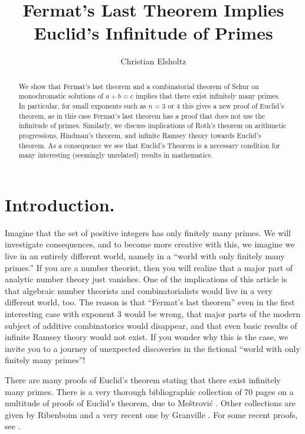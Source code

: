 \documentclass{article}
\theoremstyle{theorem}
\theoremstyle{definition}
\begin{document}
\title{
Fermat's Last Theorem Implies\\ Euclid's Infinitude of Primes}
\author{Christian Elsholtz
}
\maketitle



\begin{abstract}
We show that Fermat's last theorem and a combinatorial theorem of Schur on 
monochromatic solutions of $a+b=c$ implies that there exist infinitely 
many primes. In particular, for small exponents such as $n=3$ or $4$ 
this gives a new proof of Euclid's theorem, 
as in this case Fermat's last theorem has a proof that does not use 
the infinitude of primes. Similarly, we discuss implications of
Roth's theorem on arithmetic progressions, Hindman's theorem, and infinite
Ramsey theory towards Euclid's theorem.
As a consequence we see that Euclid's Theorem is a necessary condition for many
interesting (seemingly unrelated) results in mathematics.
\end{abstract}


\section{Introduction.}
Imagine that the set of positive integers has only finitely many primes.
We will investigate consequences, and to become more creative with this, we imagine 
we live in an entirely different world, namely in a ``world with only finitely many primes.''
If you are a number theorist, then you will realize that a major part of analytic number theory
just vanishes. One of the implications of this article is that algebraic
number theorists and combinatorialists would live in a very different 
world, too.
The reason is that ``Fermat's last theorem'' even in the first interesting case 
with exponent $3$ would be wrong, that major parts of the modern subject of
additive combinatorics would disappear,
and that even basic results of infinite Ramsey theory would not exist. 
If you wonder why
this is the case, we invite you to a journey
of unexpected discoveries in the 
fictional ``world with only finitely many primes''!



 There are many proofs of Euclid's theorem stating that there exist
infinitely many primes. 
There is a very thorough bibliographic collection of 70 pages on a multitude of proofs of Euclid's theorem,
due to Me\v{s}trovi\'{c} \cite{Mestrovic}. 
Other collections are given by Ribenboim \cite{Ribenboim} 
and a very recent one by Granville \cite{GranvilleLMS}. 
For some recent proofs, see \cite{Saidak:2006, Wooley}.
\end{document}
